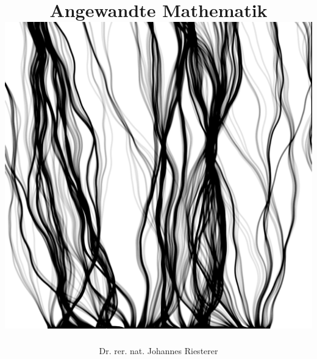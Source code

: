 \documentclass{beamer}
\begin{document}
\title[Angewandte Mathematik] %
{Angewandte Mathematik
\\
\includegraphics[scale=0.15]{images/cover}
}
\subtitle{}
\author[Dr. Johannes Riesterer] %
{Dr.  rer. nat. Johannes Riesterer}

\date[KPT 2004] %
{}

\subject{Angewandte Mathematik}

\frame{\titlepage}
\end{document}
